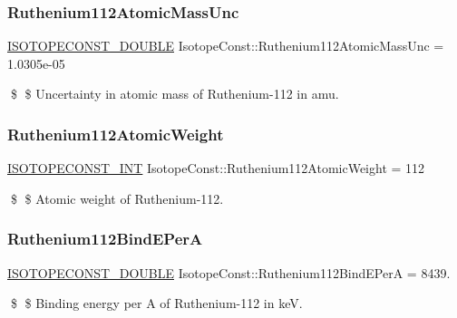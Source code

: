 \subsubsection{\texorpdfstring{Ruthenium112\+Atomic\+Mass\+Unc}{Ruthenium112AtomicMassUnc}}
{\footnotesize\ttfamily \mbox{\hyperlink{group___isotope_const-_macros_ga8f45a7272ce02c0b4c65c44636ed719a}{I\+S\+O\+T\+O\+P\+E\+C\+O\+N\+S\+T\+\_\+\+D\+O\+U\+B\+LE}} Isotope\+Const\+::\+Ruthenium112\+Atomic\+Mass\+Unc = 1.\+0305e-\/05}

\$ \$ Uncertainty in atomic mass of Ruthenium-\/112 in amu. \mbox{\label{group___isotope_const-_ruthenium-_ru112_gabdad3ac206f73dc023a8eedd695cf3dd}} 
\subsubsection{\texorpdfstring{Ruthenium112\+Atomic\+Weight}{Ruthenium112AtomicWeight}}
{\footnotesize\ttfamily \mbox{\hyperlink{group___isotope_const-_macros_ga5f18360b3e99483a35c32d789e62621c}{I\+S\+O\+T\+O\+P\+E\+C\+O\+N\+S\+T\+\_\+\+I\+NT}} Isotope\+Const\+::\+Ruthenium112\+Atomic\+Weight = 112}

\$ \$ Atomic weight of Ruthenium-\/112. \mbox{\label{group___isotope_const-_ruthenium-_ru112_gab98db94901355f06817a6ddcc2cb6c1c}} 
\subsubsection{\texorpdfstring{Ruthenium112\+Bind\+E\+PerA}{Ruthenium112BindEPerA}}
{\footnotesize\ttfamily \mbox{\hyperlink{group___isotope_const-_macros_ga8f45a7272ce02c0b4c65c44636ed719a}{I\+S\+O\+T\+O\+P\+E\+C\+O\+N\+S\+T\+\_\+\+D\+O\+U\+B\+LE}} Isotope\+Const\+::\+Ruthenium112\+Bind\+E\+PerA = 8439.}

\$ \$ Binding energy per A of Ruthenium-\/112 in keV. \mbox{\label{group___isotope_const-_ruthenium-_ru112_ga3af1dcd9dfac0c25ac4cbcc45d26469a}} 
